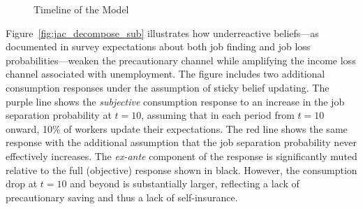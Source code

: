\begin{figure}[pt]
    \centering
    \caption{Timeline of the Model}
    \label{fig:model_timeline}
\end{figure}



Figure~\ref{fig:jac_decompose_sub} illustrates how underreactive beliefs---as documented in survey expectations about both job finding and job loss probabilities---weaken the precautionary channel while amplifying the income loss channel associated with unemployment. The figure includes two additional consumption responses under the assumption of sticky belief updating. The purple line shows the \textit{subjective} consumption response to an increase in the job separation probability at \( t = 10 \), assuming that in each period from \( t = 10 \) onward, 10\% of workers update their expectations. The red line shows the same response with the additional assumption that the job separation probability never effectively increases. The \textit{ex-ante} component of the response is significantly muted relative to the full (objective) response shown in black. However, the consumption drop at \( t = 10 \) and beyond is substantially larger, reflecting a lack of precautionary saving and thus a lack of self-insurance.

